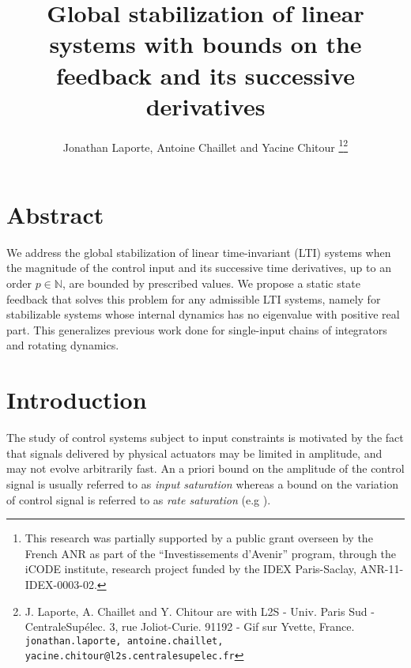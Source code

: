 \documentclass[letterpaper, 10pt]{article}
\title{\Large\bf
Global stabilization of linear systems with bounds on the feedback and its successive derivatives
}
\author{Jonathan Laporte, Antoine Chaillet and Yacine Chitour \thanks{This research was partially supported by a public grant overseen by the French ANR as part of the “Investissements d'Avenir” program, through the iCODE institute, research project funded by the IDEX Paris-Saclay, ANR-11-IDEX-0003-02.}\thanks{J. Laporte, A. Chaillet  and  Y. Chitour  are with L2S - Univ. Paris Sud - CentraleSup\'elec. 3, rue Joliot-Curie. 91192 - Gif sur Yvette, France.
        {\tt\small jonathan.laporte, antoine.chaillet, yacine.chitour@l2s.centralesupelec.fr}}}
\begin{document}
\newcommand{\AC}[1]{\textcolor{blue}{#1}}
\newcommand{\JL}[1]{\textbf{\textcolor{orange}{#1}}}
\newcommand{\ACC}[1]{\textcolor{BlueViolet}{#1}}

\date{}
\maketitle


\section*{Abstract}
We address the global stabilization of linear time-invariant (LTI) systems when the magnitude of the control input and its successive time derivatives, up to an order $p\in\mathbb N$, are bounded by prescribed values. We propose a static state feedback that solves this problem for any admissible LTI systems, namely for stabilizable systems whose internal dynamics has no eigenvalue with positive real part. This generalizes previous work done for single-input chains of integrators and rotating dynamics. 

\section{Introduction}
The study of control systems subject to input constraints is motivated by the fact that signals delivered by physical actuators may be limited in amplitude, and may not evolve arbitrarily fast. An a priori bound on the amplitude of the control signal is usually referred to as \emph{input saturation} whereas a bound on the variation of control signal is referred to as \emph{rate saturation} (e.g \cite{saberi2012}).
\end{document}
